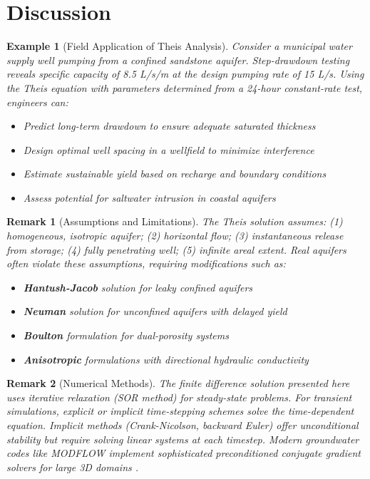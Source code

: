 \documentclass[a4paper, 11pt]{article}
\newtheorem{example}{Example}[section]
\newtheorem{remark}{Remark}[section]
\begin{document}
\section{Discussion}

\begin{example}[Field Application of Theis Analysis]
Consider a municipal water supply well pumping from a confined sandstone aquifer. Step-drawdown
testing reveals specific capacity of 8.5 L/s/m at the design pumping rate of 15 L/s. Using
the Theis equation with parameters determined from a 24-hour constant-rate test, engineers can:
\begin{itemize}
\item Predict long-term drawdown to ensure adequate saturated thickness
\item Design optimal well spacing in a wellfield to minimize interference
\item Estimate sustainable yield based on recharge and boundary conditions
\item Assess potential for saltwater intrusion in coastal aquifers
\end{itemize}
\end{example}

\begin{remark}[Assumptions and Limitations]
The Theis solution assumes: (1) homogeneous, isotropic aquifer; (2) horizontal flow;
(3) instantaneous release from storage; (4) fully penetrating well; (5) infinite areal extent.
Real aquifers often violate these assumptions, requiring modifications such as:
\begin{itemize}
\item \textbf{Hantush-Jacob} solution for leaky confined aquifers \cite{hantush1955non}
\item \textbf{Neuman} solution for unconfined aquifers with delayed yield \cite{neuman1972theory}
\item \textbf{Boulton} formulation for dual-porosity systems \cite{boulton1954unsteady}
\item \textbf{Anisotropic} formulations with directional hydraulic conductivity
\end{itemize}
\end{remark}

\begin{remark}[Numerical Methods]
The finite difference solution presented here uses iterative relaxation (SOR method) for
steady-state problems. For transient simulations, explicit or implicit time-stepping schemes
solve the time-dependent equation. Implicit methods (Crank-Nicolson, backward Euler) offer
unconditional stability but require solving linear systems at each timestep. Modern groundwater
codes like MODFLOW implement sophisticated preconditioned conjugate gradient solvers for
large 3D domains \cite{wang2000introduction}.
\end{remark}
\end{document}
